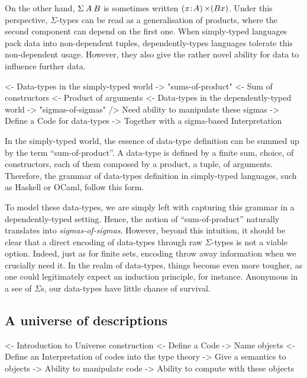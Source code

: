 On the other hand, $\SigmaTy{A}{B}$ is sometimes written
$\SIGMA{\V{x}}{A} (B x)$. Under this perspective, $\Sigma$-types can
be read as a generalisation of products, where the second component
can depend on the first one. When simply-typed languages pack data
into non-dependent tuples, dependently-types languages tolerate this
non-dependent usage. However, they also give the rather novel ability
for data to influence further data.

\begin{wstructure}
<- Data-types in the simply-typed world
    -> "sums-of-product"
        <- Sum of constructors
        <- Product of arguments
<- Data-types in the dependently-typed world
    -> "sigmas-of-sigmas"
    /> Need ability to manipulate these sigmas
        -> Define a Code for data-types
        -> Together with a sigma-based Interpretation
\end{wstructure}

In the simply-typed world, the essence of data-type definition can be
summed up by the term ``sum-of-product''. A data-type is defined by a
finite sum, choice, of constructors, each of them composed by a
product, a tuple, of arguments. Therefore, the grammar of data-types
definition in simply-typed languages, such as Haskell or OCaml, follow
this form.

To model these data-types, we are simply left with capturing this
grammar in a dependently-typed setting. Hence, the notion of
``sum-of-product'' naturally translates into
\emph{sigmas-of-sigmas}. However, beyond this intuition, it should be
clear that a direct encoding of data-types through raw $\Sigma$-types
is not a viable option. Indeed, just as for finite sets, encoding
throw away information when we crucially need it. In the realm of
data-types, things become even more tougher, as one could legitimately
expect an induction principle, for instance. Anonymous in a see of
$\Sigma$s, our data-types have little chance of survival.


\subsection{A universe of descriptions}

\begin{wstructure}
<- Introduction to Universe construction
    <- Define a Code
        -> Name objects
    <- Define an Interpretation of codes into the type theory
        -> Give a semantics to objects
    -> Ability to manipulate code
    -> Ability to compute with these objects
\end{wstructure}

